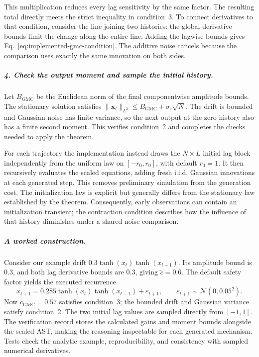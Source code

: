 This multiplication reduces every lag sensitivity by the same factor. The
resulting total directly meets the strict inequality in condition~3.
To connect derivatives to that condition, consider the line joining two
histories: the global derivative bounds limit the change along the entire
line. Adding the lagwise bounds gives
Eq.~\eqref{eq:implemented-gmc-condition}. The additive noise cancels because
the comparison uses exactly the same innovation on both sides.

\subparagraph{4. Check the output moment and sample the initial history.}
Let $B_{\mathrm{GMC}}$ be the Euclidean norm of the final componentwise
amplitude bounds. The stationary solution satisfies
$\|\mathbf x_t\|_{L^2}\leq B_{\mathrm{GMC}}+\sigma_\varepsilon\sqrt N$.
The drift is bounded and Gaussian noise has finite variance, so the next
output at the zero history also has a finite second moment. This verifies
condition~2 and completes the checks needed to apply the theorem.

For each trajectory the implementation instead draws the $N\times L$
initial lag block independently from the uniform law on $[-r_0,r_0]$,
with default $r_0=1$. It then recursively evaluates the scaled equations,
adding fresh i.i.d. Gaussian innovations at each generated step. This removes
preliminary simulation from the generation cost. The initialization law is
explicit but generally differs from the stationary law established by the
theorem. Consequently, early observations can contain an initialization
transient; the contraction condition describes how the influence of that
history diminishes under a shared-noise comparison.

\subparagraph{A worked construction.}
Consider our example drift $0.3\tanh(x_t)\tanh(x_{t-1})$.
Its amplitude bound is 0.3, and both lag derivative bounds are 0.3, giving
$\widetilde c=0.6$. The default safety factor yields the executed recurrence
\begin{equation}
 x_{t+1}=0.285\tanh(x_t)\tanh(x_{t-1})+\varepsilon_{t+1},
 \qquad \varepsilon_{t+1}\sim\mathcal N(0,0.05^2).
 \label{eq:implemented-gmc-example}
\end{equation}
Now $c_{\mathrm{GMC}}=0.57$ satisfies condition~3; the bounded drift and
Gaussian variance satisfy condition~2. The two initial lag values are sampled
directly from $[-1,1]$. The verification record stores the calculated gains
and moment bounds alongside the scaled AST, making the reasoning
inspectable for each generated mechanism. Tests check the analytic example,
reproducibility, and consistency with sampled numerical derivatives.

